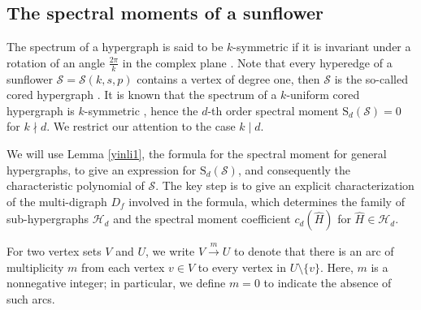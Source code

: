 \documentclass{article}
\begin{document}
\subsection{The spectral moments of a sunflower}


The spectrum of a hypergraph is said to be $k$-symmetric if it is invariant under a rotation of an angle $\frac{2\pi}{k}$ in the complex plane \cite{cooper2012spectra}.
Note that every hyperedge of a sunflower $\mathcal{S}=\mathcal{S}(k,s,p)$ contains a vertex of degree one,
then $\mathcal{S}$ is the so-called cored hypergraph \cite{hu2013cored}.
It is known that the spectrum of a $k$-uniform cored hypergraph is $k$-symmetric \cite{shao2015some},
hence the $d$-th order spectral moment $\mathrm{S}_{d}(\mathcal{S})=0$ for $k\nmid d$.
We restrict our attention to the case $k \mid d$.


We will use Lemma \ref{yinli1}, the formula for the spectral moment for general hypergraphs,
to give an expression for $\mathrm{S}_{d}(\mathcal{S})$,
and consequently the characteristic polynomial of $\mathcal{S}$.
The key step is to give an explicit characterization of the multi-digraph $D_f$ involved in the formula,  which determines the family of sub-hypergraphs $\mathcal{H}_d$ and the spectral moment coefficient $c_{d}(\widehat{H})$ for $\widehat{H} \in \mathcal{H}_d$.


For two vertex sets $V$ and $U$, we write $V \xrightarrow{m} U$ to denote that there is an arc of multiplicity $m$ from each vertex $v \in V$ to every vertex in $U \setminus\{v\}$. Here, $m$ is a nonnegative integer; in particular, we define $m=0$ to indicate the absence of such arcs.
\end{document}

